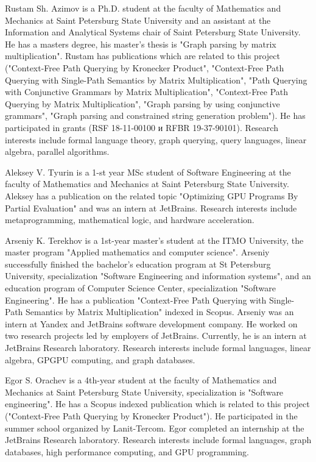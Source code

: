 \documentclass[12pt]{article}  %
\theoremstyle{remark}
\begin{document}
Rustam Sh. Azimov is a Ph.D. student at the faculty of Mathematics and Mechanics at Saint Petersburg State University and an assistant at the Information and Analytical Systems chair of Saint Petersburg State University. He has a masters degree, his master's thesis is "Graph parsing by matrix multiplication". Rustam has publications which are related to this project ("Context-Free Path Querying by Kronecker Product", "Context-Free Path Querying with Single-Path Semantics by Matrix Multiplication", "Path Querying with Conjunctive Grammars by Matrix Multiplication", "Context-Free Path Querying by Matrix Multiplication", "Graph parsing by using conjunctive grammars", "Graph parsing and constrained string generation problem"). He has participated in grants (RSF 18-11-00100 и RFBR 19-37-90101). Research interests include formal language theory, graph querying, query languages, linear algebra, parallel algorithms.

Aleksey V. Tyurin is a 1-st year MSc student of Software Engineering at the faculty of Mathematics and Mechanics at Saint Petersburg State University. Aleksey has  a publication on the related topic "Optimizing GPU Programs By Partial Evaluation" and was an intern at JetBrains. Research interests include metaprogramming, mathematical logic, and hardware acceleration.

Arseniy K. Terekhov is a 1st-year master's student at the ITMO University, the master program "Applied mathematics and computer science". Arseniy successfully finished the bachelor's education program at St Petersburg University, specialization "Software Engineering and information systems", and an education program of Computer Science Center, specialization "Software Engineering". He has a publication "Context-Free Path Querying with Single-Path Semantics by Matrix Multiplication" indexed in Scopus. Arseniy was an intern at Yandex and JetBrains software development company. He worked on two research projects led by employers of JetBrains. Currently, he is an intern at JetBrains Research laboratory. Research interests include formal languages, linear algebra, GPGPU computing, and graph databases.

Egor S. Orachev is a 4th-year student at the faculty of Mathematics and Mechanics at Saint Petersburg State University, specialization is "Software engineering". He has a Scopus indexed publication which is related to this project ("Context-Free Path Querying by Kronecker Product"). He participated in the summer school organized by Lanit-Tercom. Egor completed an internship at the JetBrains Research laboratory. Research interests include formal languages, graph databases, high performance computing, and GPU programming.
\end{document}
